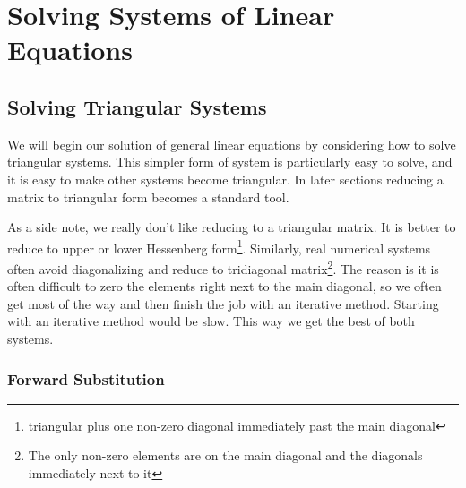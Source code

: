 \chapter{Solving Systems of Linear Equations}



\section{Solving Triangular Systems}
We will begin our solution of general linear equations by considering how to solve triangular systems.  This simpler form of system is particularly easy to solve, and it is easy to make other systems become triangular.  In later sections reducing a matrix to triangular form becomes a standard tool.

As a side note, we really don't like reducing to a triangular matrix.  It is better to reduce to upper or lower Hessenberg form\footnote{triangular plus one non-zero diagonal immediately past the main diagonal}.  Similarly, real numerical systems often avoid diagonalizing and reduce to tridiagonal matrix\footnote{The only non-zero elements are on the main diagonal and the diagonals immediately next to it}.  The reason is it is often difficult to zero the elements right next to the main diagonal, so we often get most of the way and then finish the job with an iterative method.  Starting with an iterative method would be slow.  This way we get the best of both systems.

\subsection{Forward Substitution}

